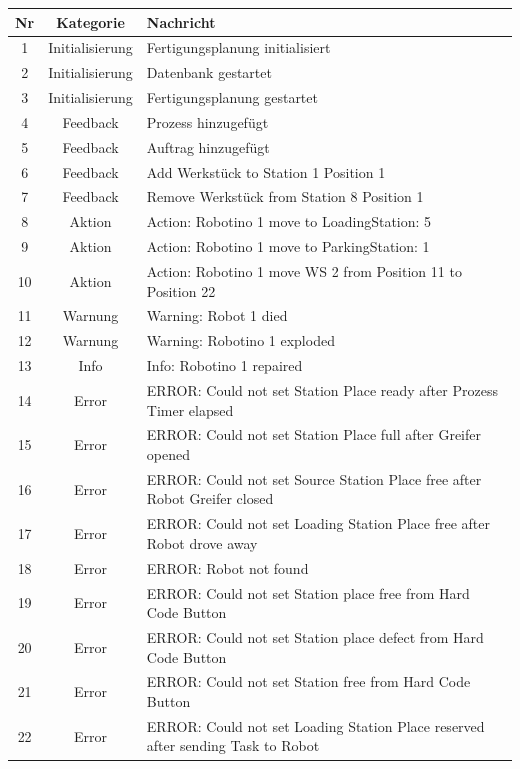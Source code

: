 \begin{table}[!ht]
	\centering
	\begin{tabular}{|c|c|p{10cm}|}
		\hline
		Nr & Kategorie &	Nachricht \\
		\hline
    1  & Initialisierung & Fertigungsplanung initialisiert \\
    2  & Initialisierung & Datenbank gestartet \\
    3  & Initialisierung & Fertigungsplanung gestartet \\
 		\hline
    4  & Feedback & Prozess hinzugefügt \\
    5  & Feedback & Auftrag hinzugefügt \\
    6  & Feedback & Add Werkstück to Station 1 Position 1 \\
    7  & Feedback & Remove Werkstück from Station 8 Position 1 \\
 		\hline
    8  & Aktion & Action: Robotino 1 move to LoadingStation: 5 \\
    9  & Aktion & Action: Robotino 1 move to ParkingStation: 1 \\
    10 & Aktion & Action: Robotino 1 move WS 2 from Position 11 to Position 22 \\
 		\hline
    11 & Warnung & Warning: Robot 1 died \\
    12 & Warnung & Warning: Robotino 1 exploded \\
    13 & Info & Info: Robotino 1 repaired \\
		\hline
    14 & Error & ERROR: Could not set Station Place ready after Prozess Timer elapsed \\
    15 & Error & ERROR: Could not set Station Place full after Greifer opened \\
    16 & Error & ERROR: Could not set Source Station Place free after Robot Greifer closed \\
    17 & Error & ERROR: Could not set Loading Station Place free after Robot drove away \\
    18 & Error & ERROR: Robot not found \\
    19 & Error & ERROR: Could not set Station place free from Hard Code Button \\
    20 & Error & ERROR: Could not set Station place defect from Hard Code Button \\
    21 & Error & ERROR: Could not set Station free from Hard Code Button \\
    22 & Error & ERROR: Could not set Loading Station Place reserved after sending Task to Robot \\

\end{tabular}
\end{table}
